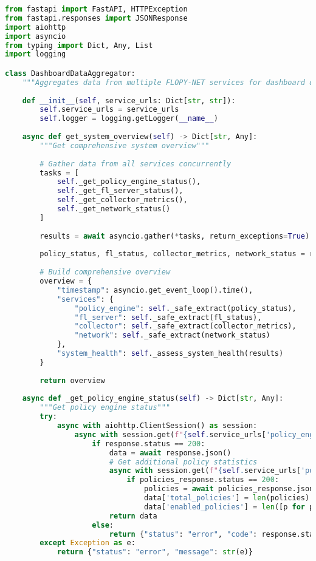 \begin{lstlisting}[language=python, caption=Dashboard Backend Extension]
from fastapi import FastAPI, HTTPException
from fastapi.responses import JSONResponse
import aiohttp
import asyncio
from typing import Dict, Any, List
import logging

class DashboardDataAggregator:
    """Aggregates data from multiple FLOPY-NET services for dashboard display"""
    
    def __init__(self, service_urls: Dict[str, str]):
        self.service_urls = service_urls
        self.logger = logging.getLogger(__name__)
    
    async def get_system_overview(self) -> Dict[str, Any]:
        """Get comprehensive system overview"""
        
        # Gather data from all services concurrently
        tasks = [
            self._get_policy_engine_status(),
            self._get_fl_server_status(),
            self._get_collector_metrics(),
            self._get_network_status()
        ]
        
        results = await asyncio.gather(*tasks, return_exceptions=True)
        
        policy_status, fl_status, collector_metrics, network_status = results
        
        # Build comprehensive overview
        overview = {
            "timestamp": asyncio.get_event_loop().time(),
            "services": {
                "policy_engine": self._safe_extract(policy_status),
                "fl_server": self._safe_extract(fl_status),
                "collector": self._safe_extract(collector_metrics),
                "network": self._safe_extract(network_status)
            },
            "system_health": self._assess_system_health(results)
        }
        
        return overview
    
    async def _get_policy_engine_status(self) -> Dict[str, Any]:
        """Get policy engine status"""
        try:
            async with aiohttp.ClientSession() as session:
                async with session.get(f"{self.service_urls['policy_engine']}/health") as response:
                    if response.status == 200:
                        data = await response.json()
                        # Get additional policy statistics
                        async with session.get(f"{self.service_urls['policy_engine']}/policies") as policies_response:
                            if policies_response.status == 200:
                                policies = await policies_response.json()
                                data['total_policies'] = len(policies)
                                data['enabled_policies'] = len([p for p in policies if p.get('enabled', False)])
                        return data
                    else:
                        return {"status": "error", "code": response.status}
        except Exception as e:
            return {"status": "error", "message": str(e)}
    

\end{lstlisting}
